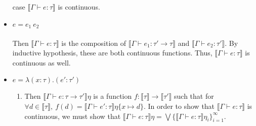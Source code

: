 \documentclass{westhesis}
\begin{document}
\begin{itemize}
case $\llbracket \Gamma \vdash e : \tau \rrbracket$ is continuous.
 \item $ e = e_1 \ e_2$ \\ \\
 Then $\llbracket \Gamma \vdash e : \tau \rrbracket$ is the composition of $\llbracket \Gamma \vdash e_1 : \tau' \rightarrow
 \tau \rrbracket$ and $\llbracket \Gamma \vdash e_2 : \tau' \rrbracket$. By inductive hypothesis, these are both continuous 
 functions. Thus, $\llbracket \Gamma \vdash e : \tau \rrbracket$ is continuous as well. 
 \item $e = \lambda (x : \tau) . (e' : \tau')$
 \begin{enumerate}
 \item Then $\llbracket \Gamma \vdash e : \tau \rightarrow \tau' \rrbracket\eta$ is a function $f: \llbracket \tau \rrbracket 
 \rightarrow 
 \llbracket \tau'  \rrbracket$ such that for $\forall d \in \llbracket \tau \rrbracket, \ f(d) = \llbracket \Gamma \vdash e' : \tau 
 \rrbracket\eta\{x \mapsto d\}$. In order to show that $\llbracket \Gamma \vdash e : \tau \rrbracket$ is continuous, we 
 must show that $\llbracket \Gamma \vdash e : \tau \rrbracket\eta = \bigvee \{ \llbracket \Gamma \vdash e : \tau \rrbracket
  \eta_i \}^{\infty}_{i=1}$. 
 

\end{enumerate}
\end{itemize}
\end{document}
